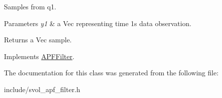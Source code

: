 Samples from q1. 


\begin{DoxyParams}{Parameters}
{\em y1} & a Vec representing time 1\textquotesingle{}s data observation. \\
\hline
\end{DoxyParams}
\begin{DoxyReturn}{Returns}
a Vec sample. 
\end{DoxyReturn}


Implements \hyperlink{classAPFFilter_a017be49a493263156ae60ccc424f7daa}{A\+P\+F\+Filter}.



The documentation for this class was generated from the following file\+:\begin{DoxyCompactItemize}
\item 
include/svol\+\_\+apf\+\_\+filter.\+h\end{DoxyCompactItemize}
